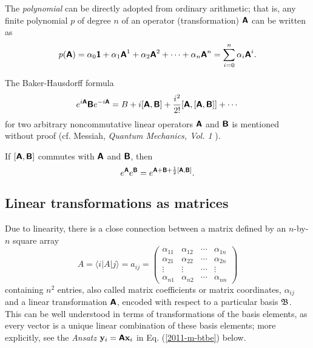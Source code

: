 The {\em polynomial}
can be directly adopted from ordinary arithmetic; that is,
any finite polynomial $p$ of degree $n$
of an operator (transformation) $\textsf{\textbf{A}}$ can be written as
\begin{equation}
p(\textsf{\textbf{A}})= \alpha_0   \textsf{\textbf{1}}
+ \alpha_1   \textsf{\textbf{A}}^1
+ \alpha_2   \textsf{\textbf{A}}^2+
\cdots
+
\alpha_n   \textsf{\textbf{A}}^n
=\sum_{i=0}^n \alpha_i \textsf{\textbf{A}}^i
.
\end{equation}

The Baker-Hausdorff formula
 \begin{equation}
 e^{i\textsf{\textbf{A}}}\textsf{\textbf{B}}e^{-i\textsf{\textbf{A}}}=
B+i[\textsf{\textbf{A}},\textsf{\textbf{B}}]+
{i^2\over 2!}[\textsf{\textbf{A}},[\textsf{\textbf{A}},\textsf{\textbf{B}}]]+\cdots
 \end{equation}
for two arbitrary noncommutative linear operators $\textsf{\textbf{A}}$ and
$\textsf{\textbf{B}}$ is mentioned without proof
(cf.  Messiah, {\sl Quantum Mechanics, Vol. 1} \cite{messiah-61}).

If $[\textsf{\textbf{A}},\textsf{\textbf{B}}]$ commutes with $\textsf{\textbf{A}}$ and
$\textsf{\textbf{B}}$, then
 \begin{equation}
 e^\textsf{\textbf{A}}e^\textsf{\textbf{B}}=
e^{\textsf{\textbf{A}}+\textsf{\textbf{B}}+{1\over 2}[\textsf{\textbf{A}},\textsf{\textbf{B}}]}.
 \end{equation}



\subsection{Linear transformations as matrices}


Due to linearity, there is a close connection between a matrix
defined by an $n$-by-$n$ square array
\begin{equation}
A = \langle i\vert A\vert j\rangle = a_{ij} =\left(
\begin{array}{ccccccc}
\alpha_{11}&
\alpha_{12}&
\cdots    &
\alpha_{1n}\\
\alpha_{21}&
\alpha_{22}&
\cdots    &
\alpha_{2n}\\
\vdots&
\vdots&
\cdots    &
\vdots\\
\alpha_{n1}&
\alpha_{n2}&
\cdots   &
\alpha_{nn}
\end{array}
\right)
\end{equation}
containing $n^2$ entries,
also called matrix coefficients or matrix coordinates, $\alpha_{ij}$ and a linear transformation
$\textsf{\textbf{A}}$, encoded with respect to a particular basis ${\frak B}$.
This can be well understood in terms of transformations of the basis elements,
as every vector is a unique linear combination of these basis elements;
more explicitly, see the {\it Ansatz} ${\bf y}_i=  \textsf{\textbf{A}}{\bf x}_i $ in Eq. (\ref{2011-m-btbe}) below.


